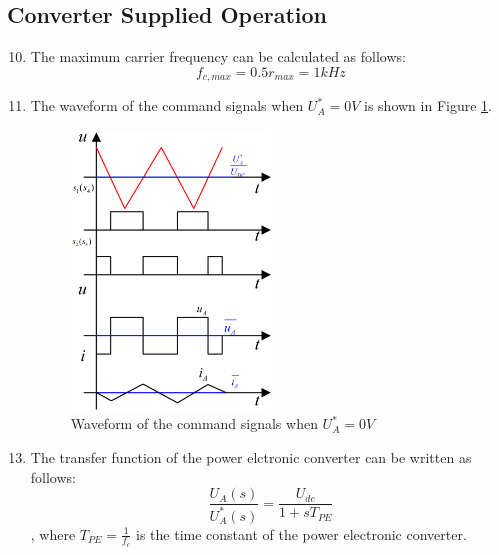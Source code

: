 \documentclass[12pt,a4paper, openany]{book}
\begin{document}
\subsection{Converter Supplied Operation}

\begin{enumerate}
\setcounter{enumi}{9} %
\item {\bf *} The maximum carrier frequency can be calculated as follows:
\begin{equation}
    f_{c,max} = 0.5r_{max} = 1kHz
\end{equation}
\item {\bf *} The waveform of the command signals when $U^*_A=0V$ is shown in Figure \ref{fig:Waveform of the command signals when $U^*_A=0V$}.
\begin{figure}[H]
    \centering
    \includegraphics[width=0.5\textwidth]{figures/PWM.png}
    \caption{Waveform of the command signals when $U^*_A=0V$}
    \label{fig:Waveform of the command signals when $U^*_A=0V$}
\end{figure}
\end{enumerate}

\begin{enumerate}
\setcounter{enumi}{12} %
\item {\bf *} The transfer function of the power elctronic converter can be written as follows:
\begin{equation}
    \frac{U_A(s)}{U^*_A(s)} = \frac{U_{dc}}{1 + sT_{PE}}
\end{equation}
, where $T_{PE}=\frac{1}{f_c}$ is the time constant of the power electronic converter.
\end{enumerate}
\end{document}
